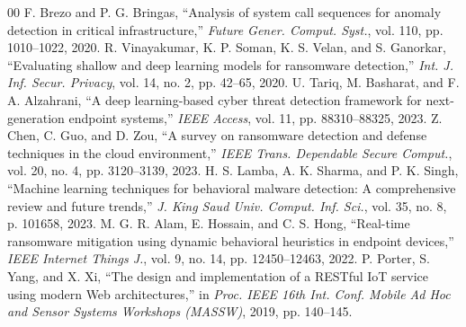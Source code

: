 \documentclass[conference]{IEEEtran}
\begin{document}
\begin{thebibliography}{00}
 F. Brezo and P. G. Bringas, ``Analysis of system call sequences for anomaly detection in critical infrastructure,'' \textit{Future Gener. Comput. Syst.}, vol. 110, pp. 1010--1022, 2020.
 R. Vinayakumar, K. P. Soman, K. S. Velan, and S. Ganorkar, ``Evaluating shallow and deep learning models for ransomware detection,'' \textit{Int. J. Inf. Secur. Privacy}, vol. 14, no. 2, pp. 42--65, 2020.
 U. Tariq, M. Basharat, and F. A. Alzahrani, ``A deep learning-based cyber threat detection framework for next-generation endpoint systems,'' \textit{IEEE Access}, vol. 11, pp. 88310--88325, 2023.
 Z. Chen, C. Guo, and D. Zou, ``A survey on ransomware detection and defense techniques in the cloud environment,'' \textit{IEEE Trans. Dependable Secure Comput.}, vol. 20, no. 4, pp. 3120--3139, 2023.
 H. S. Lamba, A. K. Sharma, and P. K. Singh, ``Machine learning techniques for behavioral malware detection: A comprehensive review and future trends,'' \textit{J. King Saud Univ. Comput. Inf. Sci.}, vol. 35, no. 8, p. 101658, 2023.
 M. G. R. Alam, E. Hossain, and C. S. Hong, ``Real-time ransomware mitigation using dynamic behavioral heuristics in endpoint devices,'' \textit{IEEE Internet Things J.}, vol. 9, no. 14, pp. 12450--12463, 2022.
 P. Porter, S. Yang, and X. Xi, ``The design and implementation of a RESTful IoT service using modern Web architectures,'' in \textit{Proc. IEEE 16th Int. Conf. Mobile Ad Hoc and Sensor Systems Workshops (MASSW)}, 2019, pp. 140--145.
\end{thebibliography}
\end{document}
